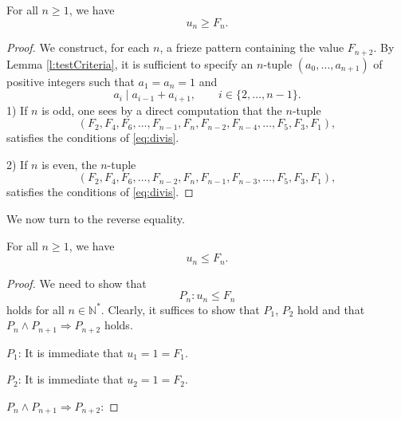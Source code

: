 \begin{lemma}
    \label{l:unLB}
    For all $n \geq 1$, we have 
    \[
        u_n \geq F_{n}.
    \]
\end{lemma}
\begin{proof}
    We construct, for each $n$, a frieze pattern containing the value $F_{n+2}$. By Lemma \ref{l:testCriteria}, 
    it is sufficient to specify an $n$-tuple $(a_0, \ldots, a_{n+1})$ of positive integers such that $a_1 = a_n =1$ and 
    \begin{equation}\label{eq:divis}
        a_i \mid a_{i-1} + a_{i+1}, \qquad i \in \{2, \ldots, n-1\}.
    \end{equation}
    1) If $n$ is odd, one sees by a direct computation that the $n$-tuple 
    \[
        (F_2,F_4, F_6, \ldots, F_{n-1}, F_{n}, F_{n-2}, F_{n-4}, \ldots, F_5, F_3, F_1), 
    \]
    satisfies the conditions of \eqref{eq:divis}. 

    2) If $n$ is even, the $n$-tuple 
    \[
        (F_2, F_4, F_6, \ldots, F_{n-2}, F_{n}, F_{n-1}, F_{n-3}, \ldots, F_5, F_3,F_1),
    \]
    satisfies the conditions of \eqref{eq:divis}. 
\end{proof}

We now turn to the reverse equality.
\begin{proposition}
    \label{l:unUB}
    For all $n \geq 1$, we have 
    \[
        u_n \leq F_{n}.
    \]
\end{proposition}
\begin{proof}
    We need to show that
    \[
        P_n : u_n \leq F_{n}
    \]
    holds for all $n \in \mathbb{N}^*$. Clearly, it suffices to show that $P_1$, $P_2$ hold and that $P_n \wedge P_{n+1} \Rightarrow P_{n+2}$
    holds. 
    
    $P_1$: It is immediate that $u_1 = 1 = F_1$. 

    $P_2$: It is immediate that $u_2 = 1 = F_2$.  

    $P_n \wedge P_{n+1} \Rightarrow P_{n+2}$: 
\end{proof}